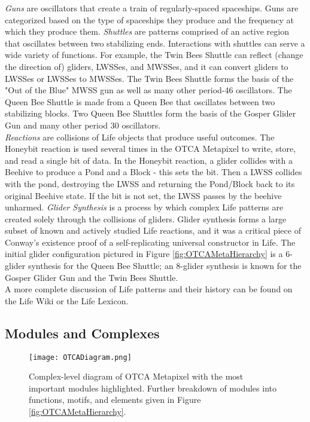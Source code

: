 {\textit{Guns} are oscillators that create a train of regularly-spaced spaceships.  Guns are categorized based on the type of spaceships they produce and the frequency at which they produce them.  \textit{Shuttles} are patterns comprised of an active region that oscillates between two stabilizing ends.  Interactions with shuttles can serve a wide variety of functions.  For example, the Twin Bees Shuttle can reflect (change the direction of) gliders, LWSSes, and MWSSes, and it can convert gliders to LWSSes or LWSSes to MWSSes.  The Twin Bees Shuttle forms the basis of the "Out of the Blue" MWSS gun as well as many other period-46 oscillators.  The Queen Bee Shuttle  is made from a Queen Bee that oscillates between two stabilizing blocks.  Two Queen Bee Shuttles form the basis of the Gosper Glider Gun and many other period 30 oscillators.\\

\textit{Reactions} are collisions of Life objects that produce useful outcomes.  The Honeybit reaction is used several times in the OTCA Metapixel to write, store, and read a single bit of data.  In the Honeybit reaction, a glider collides with a Beehive to produce a Pond and a Block - this sets the bit.  Then a LWSS collides with the pond, destroying the LWSS and returning the Pond/Block back to its original Beehive state.  If the bit is not set, the LWSS passes by the beehive unharmed.  \textit{Glider Synthesis} is a process by which complex Life patterns are created solely through the collisions of gliders.  Glider synthesis forms a large subset of known and actively studied Life reactions, and it was a critical piece of Conway's existence proof of a self-replicating universal constructor in Life.  The initial glider configuration pictured in Figure \ref{fig:OTCAMetaHierarchy} is a 6-glider synthesis for the Queen Bee Shuttle; an 8-glider synthesis is known for the Gosper Glider Gun and the Twin Bees Shuttle.\\

A more complete discussion of Life patterns and their history can be found on the Life Wiki\cite{Authors2016} or the Life Lexicon\cite{Silver2016}.

\subsection{Modules and Complexes}

\begin{figure}
  \texttt{[image: OTCADiagram.png]}
  \caption{Complex-level diagram of OTCA Metapixel with the most important modules highlighted.  Further breakdown of modules into functions, motifs, and elements given in Figure \ref{fig:OTCAMetaHierarchy}.}
  \label{fig:OTCADiagram}
\end{figure}

}
